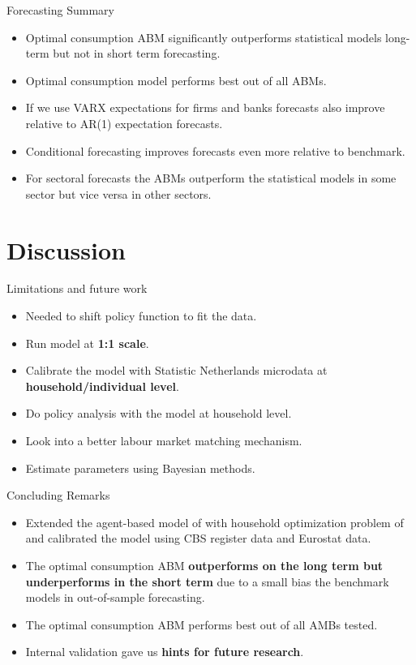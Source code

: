 \documentclass[9pt]{beamer}
\begin{document}
\begin{frame}{Forecasting Summary}
    \begin{itemize}
        \item Optimal consumption ABM significantly outperforms statistical models long-term but not in short term forecasting.
        \item Optimal consumption model performs best out of all ABMs.
        \item If we use VARX expectations for firms and banks forecasts also improve relative to AR(1) expectation forecasts.
        \item Conditional forecasting improves forecasts even more relative to benchmark.
        \item For sectoral forecasts the ABMs outperform the statistical models in some sector but vice versa in other sectors.
    \end{itemize}
\end{frame}
\section{Discussion}

\begin{frame}{Limitations and future work}
    \begin{itemize}
        \item Needed to shift policy function to fit the data.
        \item Run model at \textbf{1:1 scale}.
        \item Calibrate the model with Statistic Netherlands microdata at \textbf{household/individual level}.
        \item Do policy analysis with the model at household level.
        \item Look into a better labour market matching mechanism.
        \item Estimate parameters using Bayesian methods.
    \end{itemize}
\end{frame}
\begin{frame}{Concluding Remarks}
\begin{itemize}
    \item Extended the agent-based model of \cite{poledna_economic_2019} with household optimization problem of \cite{kaplan_monetary_2018} and calibrated the model using CBS register data and Eurostat data. 
    \item The optimal consumption ABM \textbf{outperforms on the long term but underperforms in the short term} due to a small bias the benchmark models in out-of-sample
forecasting.
\item The optimal consumption ABM performs best out of all AMBs tested.
\item Internal validation gave us \textbf{hints for future research}.
\end{itemize}
\end{frame}
\end{document}

